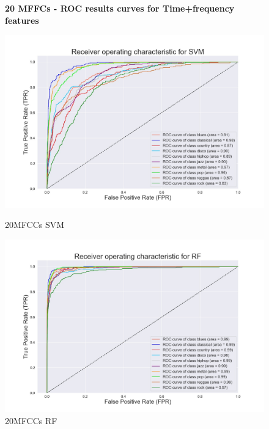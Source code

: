 \documentclass[conference]{IEEEtran}
\begin{document}
\begin{figure}[!ht]
    \begin{center}
        \small\textbf{20 MFFCs - ROC results curves for Time+frequency features}\par\medskip
        \begin{minipage}[t]{.24\textwidth}
            \centering
            \includegraphics[width=\textwidth]{plot/SL/all_features/20/SVM_20MFCC_10000_10GEN_GTZAN - ROC Plot.jpg}
            \caption{20MFCCs SVM}
            \label{fig:20MFCCs SVM Time+frequency Features}
        \end{minipage}
        \begin{minipage}[t]{.24\textwidth}
            \centering
            \includegraphics[width=\textwidth]{plot/SL/all_features/20/RF_20MFCC_10000_10GEN_GTZAN - ROC Plot.jpg}
            \caption{20MFCCs RF}
            \label{fig:20MFCCs RF Time+frequency Features}

\end{minipage}
\end{center}
\end{figure}
\end{document}
